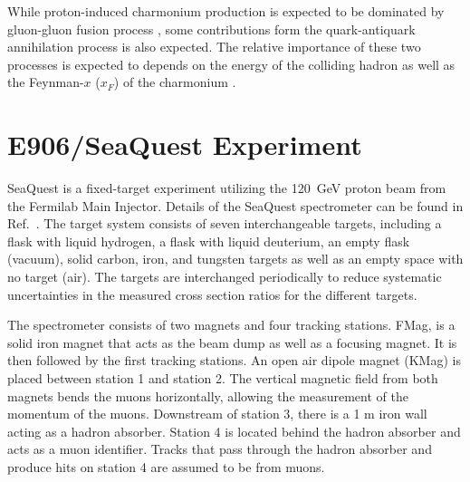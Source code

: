 \documentclass[10pt, a4paper,final]{article}
\begin{document}
While proton-induced charmonium production is expected to be dominated by gluon-gluon
fusion process \cite{vogt1999}, some contributions form the quark-antiquark
annihilation process is also expected. The relative importance of these two
processes is expected to depends on the energy of the colliding hadron as well
as the Feynman-$x$ ($x_F$) of the charmonium \cite{peng1995}.


\section{E906/SeaQuest Experiment}
\label{sec:e906}
SeaQuest is a fixed-target experiment utilizing the \SI{120}{\GeV} proton beam
from the Fermilab Main Injector. Details of the SeaQuest spectrometer can be
found in Ref.~\cite{aidala2019}. The target system consists of seven
interchangeable targets, including a flask with liquid hydrogen, a flask with
liquid deuterium, an empty flask (vacuum), solid carbon, iron, and tungsten
targets as well as an empty space with no target (air). The targets are interchanged
periodically to reduce systematic uncertainties in the measured cross section
ratios for the different targets.

The spectrometer consists of two magnets and four tracking stations. FMag, is a
solid iron magnet that acts as the beam dump as well as a focusing magnet. It is
then followed by the first tracking stations. An open air dipole magnet (KMag) is
placed between station 1 and station 2. The vertical magnetic field from both
magnets bends the muons horizontally, allowing the measurement of the momentum
of the muons. Downstream of station 3, there is a 1 m iron wall acting as a
hadron absorber. Station 4 is located behind the hadron absorber and acts as a
muon identifier. Tracks that pass through the hadron absorber and
produce hits on station 4 are assumed to be from muons.
\end{document}
